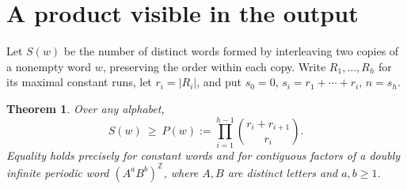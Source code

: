 \documentclass[11pt,letterpaper]{article}
\newtheorem{theorem}{Theorem}
\begin{document}
\section{A product visible in the output}
Let \(S(w)\) be the number of distinct words formed by interleaving two copies of a nonempty word \(w\), preserving the order within each copy. Write \(R_1,\dots,R_h\) for its maximal constant runs, let \(r_i=|R_i|\), and put \(s_0=0\), \(s_i=r_1+\cdots+r_i\), \(n=s_h\).
\begin{theorem}\label{th:product}
Over any alphabet,
\[
 S(w)\ \ge\ P(w):=\prod_{i=1}^{h-1}\binom{r_i+r_{i+1}}{r_i}.
\]
Equality holds precisely for constant words and for contiguous factors of a doubly infinite periodic word \((A^a B^b)^{\mathbb Z}\), where \(A,B\) are distinct letters and \(a,b\ge1\).
\end{theorem}
\end{document}

